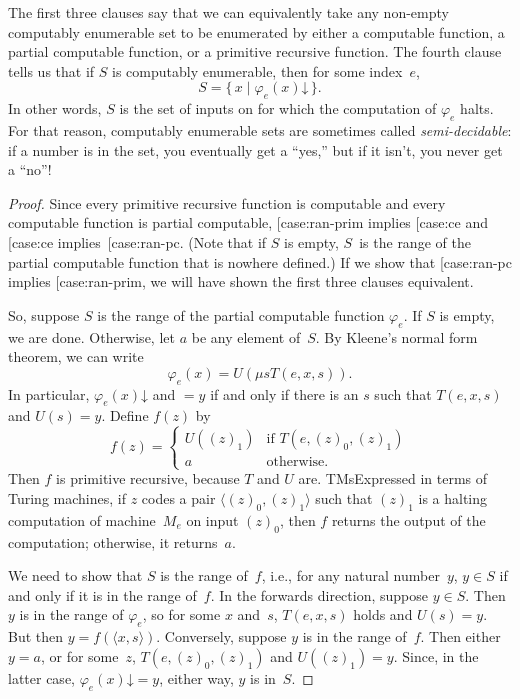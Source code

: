 \documentclass[10pt,a4paper]{article}
\makeatletter
\theoremstyle{plain}
\theoremstyle{definition}
\theoremstyle{remark}
\newenvironment{explain}{}{}
\newcommand{\olref}{\@ifnextchar[{\olref@i}{\olref@final}}
\def\olref@i[#1]{\@ifnextchar[{\olref@ii}{\olref@final}}
\def\olref@ii[#1]{\@ifnextchar[{\olref@iii}{\olref@final}}
\def\olref@iii[#1]{\olref@final}
\def\olref@final#1{\ref{#1}}
\providecommand{\tuple}[1]{\langle #1 \rangle}
\providecommand{\cfind}[1]{\varphi_{#1}}
\providecommand{\iftag}[1]{#1}
\providecommand{\fdefined}{\mathord{\downarrow}}
\providecommand{\Setabs}[2]{\{\, #1 \mid #2 \,\}}
\providecommand{\umin}{\mu}
\makeatother
\begin{document}
\begin{explain}
The first three clauses say that we can equivalently take any non-empty
computably enumerable set to be enumerated by either a computable
function, a partial computable function, or a primitive recursive
function. The fourth clause tells us that if $S$ is computably
enumerable, then for some index~$e$,
\[
S = \Setabs{x}{\cfind{e}(x) \fdefined}.
\]
In other words, $S$ is the set of inputs on for which the computation
of $\cfind{e}$ halts. For that reason, computably enumerable sets are
sometimes called \emph{semi-decidable}: if a number is in the set, you
eventually get a ``yes,'' but if it isn't, you never get a ``no''!{}
\end{explain}

\begin{proof}
Since every primitive recursive function is computable and every
computable function is partial computable, \olref{case:ran-prim}
implies \olref{case:ce} and \olref{case:ce}
implies~\olref{case:ran-pc}. (Note that if $S$ is empty, $S$~is the
range of the partial computable function that is nowhere defined.) If
we show that \olref{case:ran-pc} implies \olref{case:ran-prim}, we
will have shown the first three clauses equivalent.

So, suppose $S$ is the range of the partial computable function
$\cfind{e}$. If $S$ is empty, we are done. Otherwise, let $a$ be any
element of~$S$. By Kleene's normal form theorem, we can write
\[
\cfind{e}(x) = U(\umin{s}{T(e, x, s)}).
\]
In particular, $\cfind{e}(x) \fdefined$ and $= y$ if and only if there
is an $s$ such that $T(e, x, s)$ and $U(s) = y$. Define $f(z)$ by
\[
f(z) = \begin{cases}
  U((z)_1) & \text{if $T(e, (z)_0, (z)_1)$} \\
  a        & \text{otherwise.}
\end{cases}
\]
Then $f$ is primitive recursive, because $T$ and $U$
are. \iftag{TMs}{Expressed in terms of Turing machines, if $z$ codes a
  pair $\tuple{(z)_0, (z)_1}$ such that $(z)_1$ is a halting
  computation of machine~$M_e$ on input $(z)_0$, then $f$ returns the
  output of the computation; otherwise, it returns~$a$.}

We need to show that $S$ is the range of~$f$, i.e., for any natural
number~$y$, $y \in S$ if and only if it is in the range of~$f$. In the
forwards direction, suppose $y \in S$. Then $y$ is in the range of
$\cfind{e}$, so for some $x$ and~$s$, $T(e,x,s)$ holds and $U(s) = y$.
But then $y = f(\tuple{x,s})$. Conversely, suppose $y$ is in the range
of~$f$. Then either $y = a$, or for some~$z$, $T(e,(z)_0,(z)_1)$ and
$U((z)_1) = y$. Since, in the latter case, $\cfind{e}(x) \fdefined =
y$, either way, $y$ is in~$S$.


\end{proof}
\end{document}
